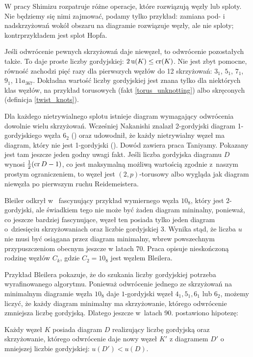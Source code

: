 W pracy \cite{shimizu14} Shimizu rozpatruje różne operacje, które rozwiązują węzły lub sploty.
Nie będziemy się nimi zajmować, podamy tylko przykład: zamiana pod- i nadskrzyżowań wokół obszaru na diagramie rozwiązuje węzły, ale nie sploty; kontrprzykładem jest splot Hopfa.

Jeśli odwrócenie pewnych skrzyżowań daje niewęzeł, to odwrócenie pozostałych także.
To daje proste liczby gordyjskiej: $2 \operatorname{u} (K) \le \operatorname{cr} (K)$.
Nie jest zbyt pomocne, równość zachodzi pięć razy dla pierwszych węzłów do 12 skrzyżowań: $3_{1}$, $5_{1}$, $7_{1}$, $9_{1}$, $11a_{367}$.
Dokładna wartość liczby gordyjskiej jest znana tylko dla niektórych klas węzłów, na przykład torusowych (fakt \ref{torus_unknotting}) albo skręconych (definicja \ref{twist_knots}).

Dla każdego nietrywialnego splotu istnieje diagram wymagający odwrócenia dowolnie wielu skrzyżowań.
Wcześniej Nakanishi znalazł 2-gordyjski diagram 1-gordyjskiego węzła $6_2$ (\cite{nakanishi83}) oraz udowodnił, że każdy nietrywialny węzeł ma diagram, który nie jest 1-gordyjski (\cite{nakanishi96}).
Dowód zawiera praca \cite{taniyama09} Taniyamy.
Pokazany jest tam jeszcze jeden godny uwagi fakt.
Jeśli liczba gordyjska diagramu $D$ wynosi $\frac 12 (\operatorname{cr} D - 1)$, co jest maksymalną możliwą wartością zgodnie z~naszym prostym ograniczeniem,
to węzeł jest $(2,p)$-torusowy albo wygląda jak diagram niewęzła po pierwszym ruchu Reidemeistera.

Bleiler odkrył w~\cite{bleiler84} fascynujący przykład wymiernego węzła $10_8$, który jest $2$-gordyjski, ale świadkiem tego nie może być żaden diagram mininalny, ponieważ, co jeszcze bardziej fascynujące, węzeł ten posiada tylko jeden diagram o~dziesięciu skrzyżowaniach oraz liczbie gordyjskiej 3.
Wynika stąd, że liczba $u$ nie musi być osiągana przez diagram minimalny, wbrew powszechnym przypuszczeniom obecnym jeszcze w latach 70.
Praca \cite{bernhard94} opisuje nieskończoną rodzinę węzłów $C_k$, gdzie $C_2 = 10_8$ jest węzłem Bleilera.

Przykład Bleilera pokazuje, że do szukania liczby gordyjskiej potrzeba wyrafinowanego algorytmu.
Ponieważ odwrócenie jednego ze skrzyżowań na minimalnym diagramie węzła $10_8$ daje $1$-gordyjski węzeł $4_1, 5_1, 6_1$ lub $6_2$, możemy liczyć, że każdy diagram minimalny ma skrzyżowanie, którego odwrócenie zmniejsza liczbę gordyjską.
Dlatego jeszcze w~latach 90. postawiono hipotezę:

\begin{conjecture}
    \label{bernhard_jablan}
    Każdy węzeł $K$ posiada diagram $D$ realizujący liczbę gordyjską oraz skrzyżowanie, którego odwrócenie daje nowy węzeł $K'$ z diagramem $D'$ o mniejszej liczbie gordyjskiej: $u(D') < u(D)$.
\end{conjecture}

